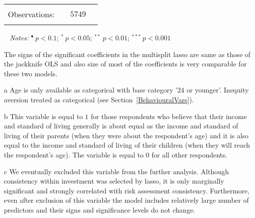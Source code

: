 \documentclass[a4paper,12pt]{article}
\begin{document}
{\begin{threeparttable}
\begin{small}
\begin{tabular}{lclccl}
\\
\hline
\vspace{-0.4cm} \\ Observations:&    \multicolumn{5}{c}{$5749$} \\  \vspace{-0.4cm}
\\
\hline
\end{tabular} 
\end{small}
 \begin{tablenotes}
  \begin{footnotesize}
  
     \item[~]\textit{Notes:} \hspace{0.2cm}$^{\bullet}~p<0.1$; $^{*}~p<0.05$; $^{**}~p<0.01$; $^{***}~p<0.001$
\vspace{-0.4cm}  \begin{adjustwidth}{0.65cm}{} \item \vspace{-0.1cm}The signs of the significant coefficients in the multisplit lasso are same as those of the jackknife OLS and also size of most of the coefficients is very comparable for these two models.\vspace{0.05cm}
\item[a]Age is only available as categorical with  base category '$24$ or younger'. Inequity aversion treated as categorical (see Section~\ref{BehaviouralVars}).
\vspace{0.05cm}
\item[b]This variable is equal to $1$ for those respondents who believe that their income and standard of living generally is about equal as the income and standard of living of their parents (when they were about the respondent's age) and it is also equal to the income and standard of living of their children (when they will reach the respondent's age). The variable is equal to $0$ for all other respondents.
\vspace{0.05cm}
\item[c]We eventually excluded this variable from the further analysis. Although consistency within investment was selected by lasso,  it is only marginally significant and strongly correlated with risk assessment consistency. Furthermore, even after exclusion of this variable the model includes relatively large number of predictors and their signs and significance levels do not change.
    \end{adjustwidth}
     
\singlespacing
  \end{footnotesize}
\end{tablenotes}
  \end{threeparttable} 
\par}
\end{document}
